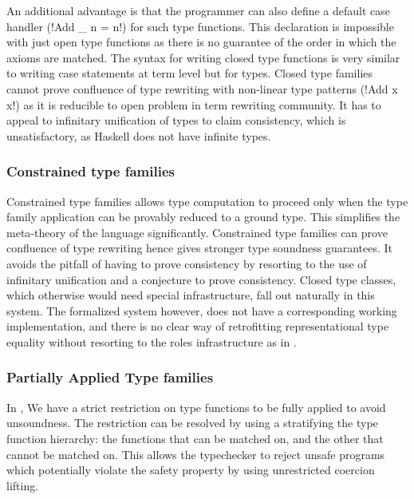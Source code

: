 \documentclass[screen,nonacm]{acmart}
\begin{document}
An additional advantage is that the programmer can also define a default case handler (!Add _ n = n!) for such type functions. This declaration is impossible with just open type functions as there is no guarantee of the order in which the axioms are matched. The syntax for writing closed type functions is very similar to writing case statements at term level but for types. Closed type families cannot prove confluence of type rewriting with non-linear type patterns (!Add x x!) as it is reducible to open problem in term rewriting community\cite{mizuhito_rta_1995}. It has to appeal to infinitary unification\cite{jaffar_efficient_1984} of types to claim consistency, which is unsatisfactory, as Haskell does not have infinite types.

\subsubsection{Constrained type families}
Constrained type families\cite{morris_typefamilies_2017} allows type computation to proceed only when the type family application can be provably reduced to a ground type. This simplifies the meta-theory of the language significantly. Constrained type families can prove confluence of type rewriting hence gives stronger type soundness guarantees. It avoids the pitfall of having to prove consistency by resorting to the use of infinitary unification and a conjecture to prove consistency. Closed type classes, which otherwise would need special infrastructure, fall out naturally in this system. The formalized system however, does not have a corresponding  working implementation, and there is no clear way of retrofitting representational type equality without resorting to the roles infrastructure as in \SFR.

\subsubsection{Partially Applied Type families}
In \SFC, We have a strict restriction on type functions to be fully applied to avoid unsoundness. The restriction can be resolved by using a stratifying the type function hierarchy\cite{kiss_higher-order_2019}: the functions that can be matched on, and the other that cannot be matched on. This allows the typechecker to reject unsafe programs which potentially violate the safety property by using unrestricted coercion lifting.
\end{document}
